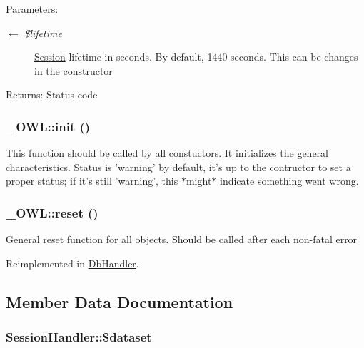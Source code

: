 \begin{Desc}
\item[Parameters:]
\begin{description}
\item[\mbox{$\leftarrow$} {\em \$lifetime}]\hyperlink{classSession}{Session} lifetime in seconds. By default, 1440 seconds. This can be changes in the constructor \end{description}
\end{Desc}
\begin{Desc}
\item[Returns:]Status code \end{Desc}
\hypertarget{class__OWL_e0ef3ded56e8a6b34b6461e5a721cd3e}{
\subsubsection{\setlength{\rightskip}{0pt plus 5cm}\_\-OWL::init ()}}
\label{class__OWL_e0ef3ded56e8a6b34b6461e5a721cd3e}


This function should be called by all constuctors. It initializes the general characteristics. Status is 'warning' by default, it's up to the contructor to set a proper status; if it's still 'warning', this $\ast$might$\ast$ indicate something went wrong. \hypertarget{class__OWL_2f2a042bcf31965194c03033df0edc9b}{
\subsubsection{\setlength{\rightskip}{0pt plus 5cm}\_\-OWL::reset ()}}
\label{class__OWL_2f2a042bcf31965194c03033df0edc9b}


General reset function for all objects. Should be called after each non-fatal error 

Reimplemented in \hyperlink{classDbHandler_9982df4830f05803935bb31bac7fae3d}{DbHandler}.

\subsection{Member Data Documentation}
\hypertarget{classSessionHandler_74c46fcfbadd4c4e6bacc73ddf350056}{
\subsubsection{\setlength{\rightskip}{0pt plus 5cm}SessionHandler::\$dataset}}
\label{classSessionHandler_74c46fcfbadd4c4e6bacc73ddf350056}


